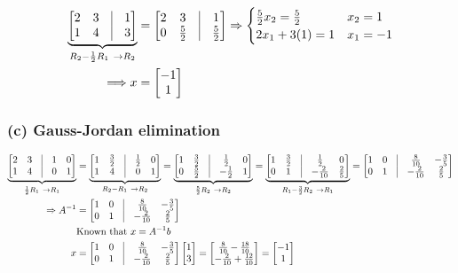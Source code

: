 \documentclass[11pt]{article}
\providecommand{\qbm}[1]{\begin{bmatrix} #1 \end{bmatrix}}
\begin{document}
\begin{align*}
    \underbrace{\qbm{ 2 & 3 & \vline & 1 \\ 1 & 4 & \vline & 3}}_{R_2 - \frac{1}{2} R_1 \ \to R_2} &= \qbm{ 2 & 3 & \vline & 1 \\ 0 & \frac{5}{2} & \vline & \frac{5}{2}}
    \Rightarrow \begin{cases}
        \frac{5}{2} x_2 = \frac{5}{2} & x_2 = 1 \\
        2 x_1 + 3(1) = 1 & x_1 = -1
    \end{cases} \\
    \Longrightarrow x &= \qbm{-1 \\ 1}
\end{align*}



\subsubsection*{(c) Gauss-Jordan elimination}


\begin{align*}
    \underbrace{\qbm{ 2 & 3 & \vline & 1 & 0 \\ 1 & 4 & \vline & 0 & 1}}_{\frac{1}{2} R_1 \ \to R_1} &= \underbrace{\qbm{ 1 & \frac{3}{2} & \vline & \frac{1}{2} & 0 \\ 1 & 4 & \vline & 0 & 1}}_{R_2 - R_1 \ \to R_2} = \underbrace{\qbm{ 1 & \frac{3}{2} & \vline & \frac{1}{2} & 0 \\ 0 & \frac{5}{2} & \vline & -\frac{1}{2} & 1}}_{\frac{5}{2}R_2 \ \to R_2} = \underbrace{\qbm{ 1 & \frac{3}{2} & \vline & \frac{1}{2} & 0 \\ 0 & 1 & \vline & -\frac{2}{10} & \frac{2}{5}}}_{R_1 - \frac{3}{2} R_2 \ \to R_1} = \qbm{ 1 & 0 & \vline & \frac{8}{10} & -\frac{3}{5} \\ 0 & 1 & \vline & -\frac{2}{10} & \frac{2}{5}} \\
    \Rightarrow A^{-1} &= \qbm{ 1 & 0 & \vline & \frac{8}{10} & -\frac{3}{5} \\ 0 & 1 & \vline & -\frac{2}{10} & \frac{2}{5}} \\
    &\text{Known that} \ x = A^{-1} b \\
    x &= \qbm{ 1 & 0 & \vline & \frac{8}{10} & -\frac{3}{5} \\ 0 & 1 & \vline & -\frac{2}{10} & \frac{2}{5}} \qbm{1 \\ 3} = \qbm{\frac{8}{10} - \frac{18}{10} \\ -\frac{2}{10} + \frac{12}{10}} = \qbm{-1 \\ 1}
\end{align*}\newline
\end{document}
